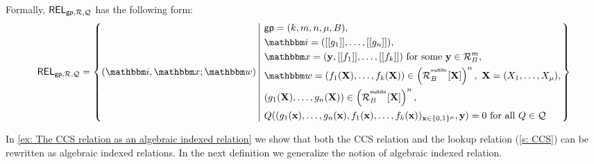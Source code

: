 \documentclass[11pt,letterpaper,usenames,dvipsnames]{article}
\begin{document}
\begin{definition}
    Formally, $\mathsf{REL}_{\mathsf{gp},\mathcal{R},\mathcal{Q}}$ has the following form:
    \begin{equation*}
    \begin{aligned}
    \REL_{\gparams,\R,\cQ} = \left\{ (\idx, \inp ; \wit) \left| \ \begin{aligned}
    & \gparams=(k,m,n,\mu, B),  \\
    & \idx = ( \oracle{g_1},\ldots, \oracle{g_n}), \\
    & \inp =(\yy, \oracle{f_1}, \ldots, \oracle{f_k}) \text{ for some } \yy\in \R_B^{m},\\    
        &\wit = (f_1(\XX), \ldots, f_k(\XX)) \in \left(\R_B^{^{\multilin}}[\XX]\right)^{n},    \ \XX=(X_1,\ldots, X_\mu),\\
        &(g_1(\XX),\dots,g_n(\XX))\in \left(\R_B^{^{\multilin}}[\XX]\right)^{n},\\
        &Q((g_1(\xx),\ldots, g_n(\xx), f_1(\xx),\ldots, f_k(\xx))_{\xx\in \BB^\mu}, \yy) =0  \text{ for all } Q\in \cQ
    \end{aligned} \right.\right\}
    \end{aligned}
    \end{equation*}
    \end{definition}
    In \cref{ex: The CCS relation as an algebraic indexed relation} we show that both the CCS relation and the lookup relation (\cref{s: CCS}) can be rewritten as algebraic indexed relations.  In the next definition we generalize the notion of algebraic indexed relation.
%
\end{document}
